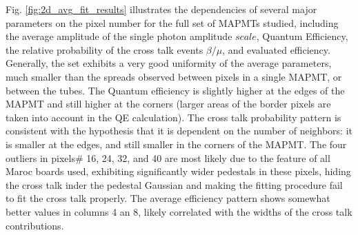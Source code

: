Fig. \ref{fig:2d_avg_fit_results} illustrates the dependencies of several major parameters on the pixel number for the full set of MAPMTs studied, including the average amplitude of the single photon amplitude $scale$, Quantum Efficiency, the relative probability of the cross talk events $\beta/\mu$, and evaluated efficiency. Generally, the set exhibits a very good uniformity of the average parameters, much smaller than the spreads observed between pixels in a single MAPMT, or between the tubes. The Quantum efficiency is slightly higher at the edges of the MAPMT and still higher at the corners (larger areas of the border pixels are taken into account in the QE calculation). The cross talk probability pattern is consistent with the hypothesis that it is dependent on the number of neighbors: it is smaller at the edges, and still smaller in the corners of the MAPMT. The four outliers in pixels# 16, 24, 32, and 40 are most likely due to the feature of all Maroc boards used, exhibiting significantly wider pedestals in these pixels, hiding the cross talk inder the pedestal Gaussian and making the fitting procedure fail to fit the cross talk properly. The average efficiency pattern shows somewhat better values in columns 4 an 8, likely correlated with the widths of the cross talk contributions.    
